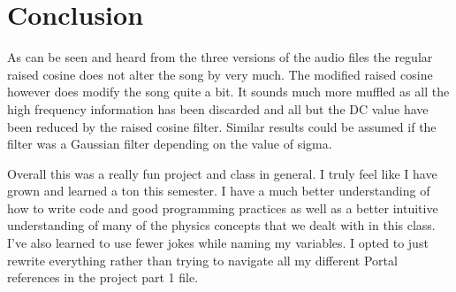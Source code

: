 \documentclass[letterpaper,10pt,english]{jupyterBook}
\begin{document}
\chapter{Conclusion}
\label{\detokenize{content/1_conclusion:conclusion}}\label{\detokenize{content/1_conclusion::doc}}
\sphinxAtStartPar
As can be seen and heard from the three versions of the audio files the regular raised cosine does not alter the song by very much. The modified raised cosine however does modify the song quite a bit. It sounds much more muffled as all the high frequency information has been discarded and all but the DC value have been reduced by the raised cosine filter. Similar results could be assumed if the filter was a Gaussian filter depending on the value of sigma.

\sphinxAtStartPar
Overall this was a really fun project and class in general. I truly feel like I have grown and learned a ton this semester. I have a much better understanding of how to write code and good programming practices as well as a better intuitive understanding of many of the physics concepts that we dealt with in this class. I’ve also learned to use fewer jokes while naming my variables. I opted to just rewrite everything rather than trying to navigate all my different Portal references in the project part 1 file.

\sphinxAtStartPar
{}







\renewcommand{\indexname}{Index}
\printindex
\end{document}
